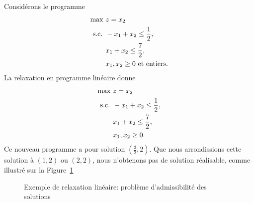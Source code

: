 \begin{example}
Considérons le programme
\begin{align*}
\max\ & z = x_2\\
\mbox{s.c. } & -x_1+x_2 \leq \frac{1}{2}, \\
& x_1 + x_2 \leq \frac{7}{2}, \\
& x_1, x_2 \geq 0 \mbox{ et entiers}.
\end{align*}
La relaxation en programme linéaire donne
\begin{align*}
\max\ & z = x_2\\
\mbox{s.c. } & -x_1+x_2 \leq \frac{1}{2}, \\
& x_1 + x_2 \leq \frac{7}{2}, \\
& x_1, x_2 \geq 0.
\end{align*}
Ce nouveau programme a pour solution $\left( \frac{3}{2},2\right)$. Que nous arrondissions cette solution à $(1,2)$ ou $(2,2)$, nous n'obtenons pas de solution réalisable, comme illustré sur la Figure~\ref{fig:relaxation_1}
\begin{figure}[htb]
\begin{center}
\caption{Exemple de relaxation linéaire: problème d'admissibilité des solutions}
\label{fig:relaxation_1}
\end{center}
\end{figure}
\end{example}

